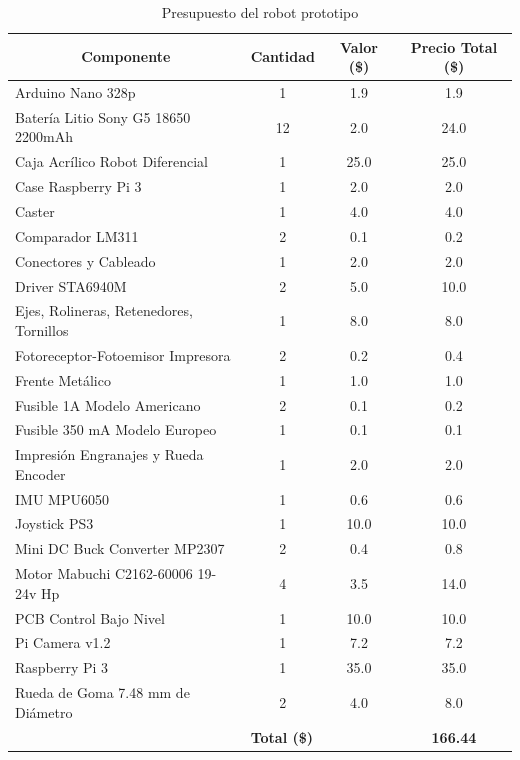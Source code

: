 \begin{table}[H]
	\caption{Presupuesto del robot prototipo}
	\begin{tabular}{|l|c|c|c|}
		\hline
		\multicolumn{1}{|c|}{\textbf{Componente}} & \textbf{Cantidad} & \textbf{Valor (\$)} & \textbf{Precio Total (\$)} \\ \hline
		Arduino Nano 328p & 1 & 1.9 & 1.9 \\ \hline
		Batería Litio Sony G5 18650  2200mAh  & 12 & 2.0 & 24.0 \\ \hline
		Caja Acrílico Robot Diferencial & 1 & 25.0 & 25.0 \\ \hline
		Case Raspberry Pi 3 & 1 & 2.0 & 2.0 \\ \hline
		Caster & 1 & 4.0 & 4.0 \\ \hline
		Comparador LM311 & 2 & 0.1 & 0.2 \\ \hline
		Conectores y Cableado & 1 & 2.0 & 2.0 \\ \hline
		Driver STA6940M & 2 & 5.0 & 10.0 \\ \hline
		Ejes, Rolineras, Retenedores, Tornillos & 1 & 8.0 & 8.0 \\ \hline
		Fotoreceptor-Fotoemisor Impresora & 2 & 0.2 & 0.4 \\ \hline
		Frente Metálico & 1 & 1.0 & 1.0 \\ \hline
		Fusible 1A  Modelo  Americano & 2 & 0.1 & 0.2 \\ \hline
		Fusible 350 mA Modelo Europeo & 1 & 0.1 & 0.1 \\ \hline
		Impresión Engranajes y Rueda Encoder & 1 & 2.0 & 2.0 \\ \hline
		IMU MPU6050 & 1 & 0.6 & 0.6 \\ \hline
		Joystick PS3 & 1 & 10.0 & 10.0 \\ \hline
		Mini DC Buck Converter MP2307 & 2 & 0.4 & 0.8 \\ \hline
		Motor Mabuchi C2162-60006 19-24v Hp & 4 & 3.5 & 14.0 \\ \hline
		PCB Control Bajo Nivel & 1 & 10.0 & 10.0 \\ \hline
		Pi Camera  v1.2 & 1 & 7.2 & 7.2 \\ \hline
		Raspberry Pi 3 & 1 & 35.0 & 35.0 \\ \hline
		Rueda de Goma 7.48 mm de Diámetro & 2 & 4.0 & 8.0 \\ \hline
		& \multicolumn{1}{l|}{\textbf{Total (\$)}} & \multicolumn{1}{l|}{} & \textbf{166.44} \\ \hline
	\end{tabular}
	\label{PresupuestoRobot}
\end{table}

